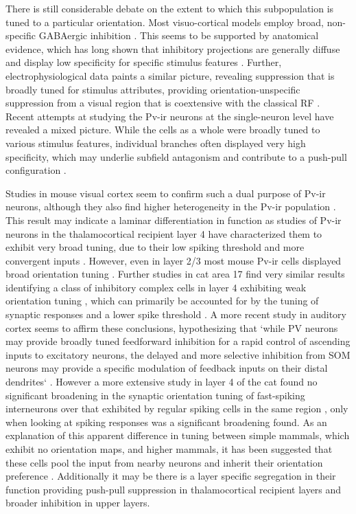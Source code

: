 There is still considerable debate on the extent to which this
subpopulation is tuned to a particular orientation. Most
visuo-cortical models employ broad, non-specific GABAergic inhibition
\citep{Somers1998,Troyer1998}. This seems to be supported by
anatomical evidence, which has long shown that inhibitory projections
are generally diffuse and display low specificity for specific
stimulus features \citep{Albus1994,Kisvarday1997a}. Further,
electrophysiological data paints a similar picture, revealing
suppression that is broadly tuned for stimulus attributes, providing
orientation-unspecific suppression from a visual region that is
coextensive with the classical RF \citep{DeAngelis1992}. Recent
attempts at studying the Pv-ir neurons at the single-neuron level have
revealed a mixed picture. While the cells as a whole were broadly
tuned to various stimulus features, individual branches often
displayed very high specificity, which may underlie subfield
antagonism and contribute to a push-pull configuration
\citep{Kisvarday2002}. 

Studies in mouse visual cortex seem to confirm such a dual purpose of
Pv-ir neurons, although they also find higher heterogeneity in the
Pv-ir population \citep{Runyan2010}. This result may indicate a
laminar differentiation in function as studies of Pv-ir neurons in the
thalamocortical recipient layer 4 have characterized them to exhibit
very broad tuning, due to their low spiking threshold and more
convergent inputs \citep{Ma2011}. However, even in layer 2/3 most
mouse Pv-ir cells displayed broad orientation tuning
\citep{Hofer2011}. Further studies in cat area 17 find very similar
results identifying a class of inhibitory complex cells in layer 4
exhibiting weak orientation tuning \citep{Hirsch2003}, which can
primarily be accounted for by the tuning of synaptic responses and a
lower spike threshold \citep{Nowak2008}.  A more recent study in
auditory cortex seems to affirm these conclusions, hypothesizing that
`while PV neurons may provide broadly tuned feedforward inhibition for
a rapid control of ascending inputs to excitatory neurons, the delayed
and more selective inhibition from SOM neurons may provide a specific
modulation of feedback inputs on their distal dendrites`
\citep{Li2014}. However a more extensive study in layer 4 of the cat
found no significant broadening in the synaptic orientation tuning of
fast-spiking interneurons over that exhibited by regular spiking cells
in the same region \citep{Cardin2007}, only when looking at spiking
responses was a significant broadening found. As an explanation of
this apparent difference in tuning between simple mammals, which
exhibit no orientation maps, and higher mammals, it has been suggested
that these cells pool the input from nearby neurons and inherit their
orientation preference \citep{Isaacson2011}. Additionally it may be
there is a layer specific segregation in their function providing
push-pull suppression in thalamocortical recipient layers and broader
inhibition in upper layers.

